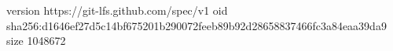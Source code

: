 version https://git-lfs.github.com/spec/v1
oid sha256:d1646ef27d5c14bf675201b290072feeb89b92d28658837466fc3a84eaa39da9
size 1048672
